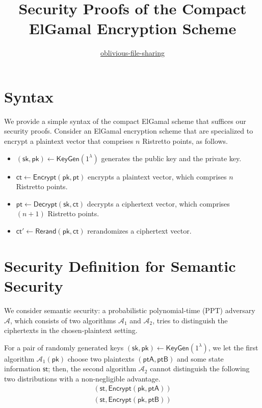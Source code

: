 \documentclass{article}
\title{\bf Security Proofs of the Compact ElGamal Encryption Scheme}
\author{\href{https://www.github.com/oblivious-file-sharing/}{oblivious-file-sharing}}
\date{}
\begin{document}
\maketitle

\section{Syntax}
We provide a simple syntax of the compact ElGamal scheme that suffices our security proofs. Consider an ElGamal encryption scheme that are specialized to encrypt a plaintext vector that comprises $n$ Ristretto points, as follows.

\begin{itemize}
    \item $\left(\mathsf{sk}, \mathsf{pk}\right)\leftarrow \mathsf{KeyGen}\left(1^\lambda\right)$ generates the public key and the private key.
    
    \item $\mathsf{ct}\leftarrow\mathsf{Encrypt}\left(\mathsf{pk},\mathsf{pt}\right)$ encrypts a plaintext vector, which comprises $n$ Ristretto points.
    
    \item $\mathsf{pt}\leftarrow\mathsf{Decrypt}\left(\mathsf{sk},\mathsf{ct}\right)$ decrypts a ciphertext vector, which comprises $(n+1)$ Ristretto points.
    
    \item $\mathsf{ct}'\leftarrow\mathsf{Rerand}\left(\mathsf{pk},\mathsf{ct}\right)$ rerandomizes a ciphertext vector.
\end{itemize}

\section{Security Definition for Semantic Security}
We consider semantic security: a probabilistic polynomial-time (PPT) adversary $\mathcal{A}$, which consists of two algorithms $\mathcal{A}_1$ and $\mathcal{A}_2$, tries to distinguish the ciphertexts in the chosen-plaintext setting. 

For a pair of randomly generated keys $(\mathsf{sk},\mathsf{pk})\leftarrow\mathsf{KeyGen}(1^\lambda)$, we let the first algorithm $\mathcal{A}_1(\mathsf{pk})$ choose two plaintexts $(\mathsf{ptA}, \mathsf{ptB})$ and some state information $\mathsf{st}$; then, the second algorithm $\mathcal{A}_2$ cannot distinguish the following two distributions with a non-negligible advantage.
\[
\begin{array}{c}
(\mathsf{st}, \mathsf{Encrypt}\left(\mathsf{pk}, \mathsf{ptA}\right))\\
(\mathsf{st}, \mathsf{Encrypt}\left(\mathsf{pk}, \mathsf{ptB}\right))
\end{array}
\]
\end{document}
